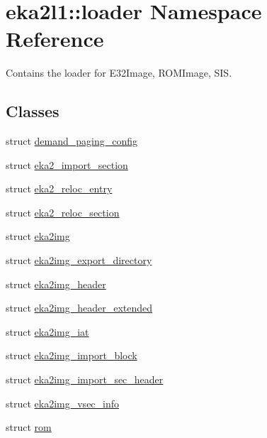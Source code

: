 \hypertarget{namespaceeka2l1_1_1loader}{}\section{eka2l1\+:\+:loader Namespace Reference}
\label{namespaceeka2l1_1_1loader}


Contains the loader for E32\+Image, R\+O\+M\+Image, S\+IS.  


\subsection*{Classes}
\begin{DoxyCompactItemize}
\item 
struct \mbox{\hyperlink{structeka2l1_1_1loader_1_1demand__paging__config}{demand\+\_\+paging\+\_\+config}}
\item 
struct \mbox{\hyperlink{structeka2l1_1_1loader_1_1eka2__import__section}{eka2\+\_\+import\+\_\+section}}
\item 
struct \mbox{\hyperlink{structeka2l1_1_1loader_1_1eka2__reloc__entry}{eka2\+\_\+reloc\+\_\+entry}}
\item 
struct \mbox{\hyperlink{structeka2l1_1_1loader_1_1eka2__reloc__section}{eka2\+\_\+reloc\+\_\+section}}
\item 
struct \mbox{\hyperlink{structeka2l1_1_1loader_1_1eka2img}{eka2img}}
\item 
struct \mbox{\hyperlink{structeka2l1_1_1loader_1_1eka2img__export__directory}{eka2img\+\_\+export\+\_\+directory}}
\item 
struct \mbox{\hyperlink{structeka2l1_1_1loader_1_1eka2img__header}{eka2img\+\_\+header}}
\item 
struct \mbox{\hyperlink{structeka2l1_1_1loader_1_1eka2img__header__extended}{eka2img\+\_\+header\+\_\+extended}}
\item 
struct \mbox{\hyperlink{structeka2l1_1_1loader_1_1eka2img__iat}{eka2img\+\_\+iat}}
\item 
struct \mbox{\hyperlink{structeka2l1_1_1loader_1_1eka2img__import__block}{eka2img\+\_\+import\+\_\+block}}
\item 
struct \mbox{\hyperlink{structeka2l1_1_1loader_1_1eka2img__import__sec__header}{eka2img\+\_\+import\+\_\+sec\+\_\+header}}
\item 
struct \mbox{\hyperlink{structeka2l1_1_1loader_1_1eka2img__vsec__info}{eka2img\+\_\+vsec\+\_\+info}}
\item 
struct \mbox{\hyperlink{structeka2l1_1_1loader_1_1rom}{rom}}

\end{DoxyCompactItemize}
